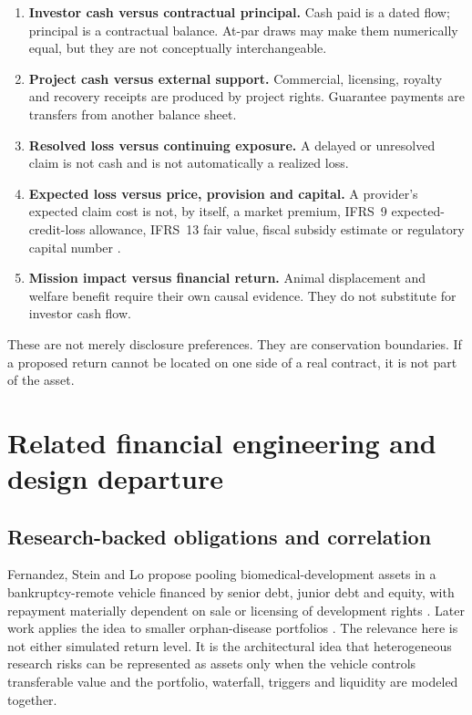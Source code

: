 \documentclass[11pt,a4paper]{article}
\begin{document}
\begin{enumerate}
  \item \textbf{Investor cash versus contractual principal.} Cash paid is a dated flow; principal is a contractual balance. At-par draws may make them numerically equal, but they are not conceptually interchangeable.
  \item \textbf{Project cash versus external support.} Commercial, licensing, royalty and recovery receipts are produced by project rights. Guarantee payments are transfers from another balance sheet.
  \item \textbf{Resolved loss versus continuing exposure.} A delayed or unresolved claim is not cash and is not automatically a realized loss.
  \item \textbf{Expected loss versus price, provision and capital.} A provider's expected claim cost is not, by itself, a market premium, IFRS~9 expected-credit-loss allowance, IFRS~13 fair value, fiscal subsidy estimate or regulatory capital number \citep{ifrs9,ifrs13,omb2025a11,eu2024financialregulation,basel2026framework}.
  \item \textbf{Mission impact versus financial return.} Animal displacement and welfare benefit require their own causal evidence. They do not substitute for investor cash flow.
\end{enumerate}

These are not merely disclosure preferences. They are conservation boundaries. If a proposed return cannot be located on one side of a real contract, it is not part of the asset.

\section{Related financial engineering and design departure}

\subsection{Research-backed obligations and correlation}

Fernandez, Stein and Lo propose pooling biomedical-development assets in a bankruptcy-remote vehicle financed by senior debt, junior debt and equity, with repayment materially dependent on sale or licensing of development rights \citep{fernandez2012rbo}. Later work applies the idea to smaller orphan-disease portfolios \citep{fagnan2014orphan}. The relevance here is not either simulated return level. It is the architectural idea that heterogeneous research risks can be represented as assets only when the vehicle controls transferable value and the portfolio, waterfall, triggers and liquidity are modeled together.
\end{document}
